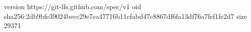 version https://git-lfs.github.com/spec/v1
oid sha256:2db9bfe39024becc29e7ca47716b11cfabd47c8867df6fa13df76a7fef1fe2d7
size 29371
